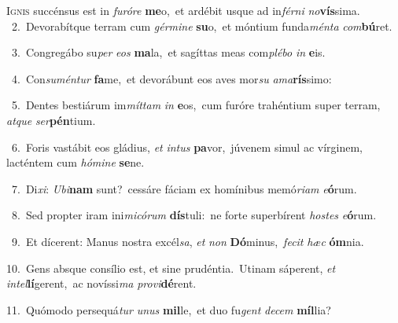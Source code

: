\lettrine{\initial\textcolor{\initialcolor}{I}}{gnis} succénsus est in \textit{fu}\-\textit{ró}\textit{re} \textbf{me}\-o,~\star et ardébit usque ad in\-\textit{fér}\-\textit{ni} \textit{no}\-\textbf{vís}sima.\\
{\numbfont\textcolor{\numbcolor}{~2.}}~Devorabítque terram cum \textit{gér}\-\textit{mi}\textit{ne} \textbf{su}\-o,~\star et móntium funda\-\textit{mén}\-\textit{ta} \textit{com}\-\textbf{bú}ret.\par
{\numbfont\textcolor{\numbcolor}{~3.}}~Congregábo su\textit{per} \textit{e}\-\textit{os} \textbf{ma}\-la,~\star et sagíttas meas com\-\textit{plé}\-\textit{bo} \textit{in} \textbf{e}\-is.\par
{\numbfont\textcolor{\numbcolor}{~4.}}~Con\-\textit{su}\-\textit{mén}\textit{tur} \textbf{fa}\-me,~\star et devorábunt eos aves mor\textit{su} \textit{a}\-\textit{ma}\textbf{rís}simo:\par
{\numbfont\textcolor{\numbcolor}{~5.}}~Dentes bestiárum im\-\textit{mít}\-\textit{tam} \textit{in} \textbf{e}\-os,~\star cum furóre trahéntium super terram, \textit{at}\-\textit{que} \textit{ser}\-\textbf{pén}tium.\par
{\numbfont\textcolor{\numbcolor}{~6.}}~Foris vastábit eos gládius, \textit{et} \textit{in}\-\textit{tus} \textbf{pa}\-vor,~\star júvenem simul ac vírginem, lacténtem cum \textit{hó}\-\textit{mi}\textit{ne} \textbf{se}\-ne.\par
{\numbfont\textcolor{\numbcolor}{~7.}}~Di\-\textit{xi}\-: \textit{U}\-\textit{bi}\textbf{nam} sunt?~\star cessáre fáciam ex homínibus memó\-\textit{ri}\-\textit{am} \textit{e}\-\textbf{ó}rum.\par
{\numbfont\textcolor{\numbcolor}{~8.}}~Sed propter iram ini\-\textit{mi}\-\textit{có}\textit{rum} \textbf{dís}\-tuli:~\star ne forte superbírent \textit{hos}\-\textit{tes} \textit{e}\-\textbf{ó}rum.\par
{\numbfont\textcolor{\numbcolor}{~9.}}~Et dícerent: Manus nostra excél\-\textit{sa}\-, \textit{et} \textit{non} \textbf{Dó}\-minus,~\star \textit{fe}\-\textit{cit} \textit{hæc} \textbf{óm}\-nia.\par
{\numbfont\textcolor{\numbcolor}{10.}}~Gens absque consílio est, et sine prudéntia.~\dagger Utinam sáperent, \textit{et} \textit{in}\-\textit{tel}\textbf{lí}gerent,~\star ac novíssi\textit{ma} \textit{pro}\-\textit{vi}\textbf{dé}rent.\par
{\numbfont\textcolor{\numbcolor}{11.}}~Quómodo persequá\textit{tur} \textit{u}\-\textit{nus} \textbf{mil}\-le,~\star et duo fu\textit{gent} \textit{de}\-\textit{cem} \textbf{míl}\-lia?\par

